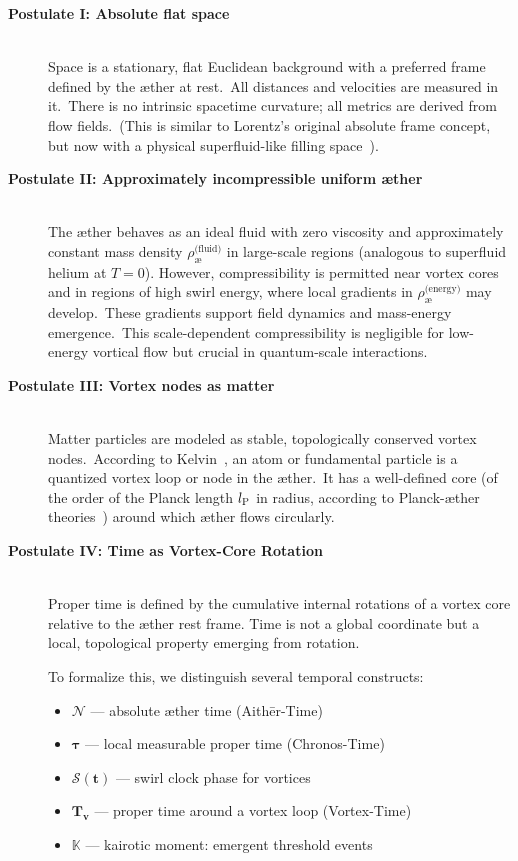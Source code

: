\documentclass[a4paper,12pt]{article}
\begin{document}
\begin{description}
    \item[\textbf{Postulate I: Absolute flat space}] \hfill \\
    Space is a stationary, flat Euclidean background with a preferred frame defined by the æther at rest.\ All distances and velocities are measured in it.\ There is no intrinsic spacetime curvature; all metrics are derived from flow fields.\ (This is similar to Lorentz's original absolute frame concept, but now with a physical superfluid-like filling space~\cite{Winterberg2002-PlanckÆther}).

    \item[\textbf{Postulate II: Approximately incompressible uniform æther}] \hfill \\
    The æther behaves as an ideal fluid with zero viscosity and approximately constant mass density \textbf{$\rho^{\text{(fluid)}}_{\text{\ae}}$} in large-scale regions (analogous to superfluid helium at $T=0$). However, compressibility is permitted near vortex cores and in regions of high swirl energy, where local gradients in \textbf{$\rho^{\text{(energy)}}_{\text{\ae}}$} may develop.\ These gradients support field dynamics and mass-energy emergence.\ This scale-dependent compressibility is negligible for low-energy vortical flow but crucial in quantum-scale interactions.

    \item[\textbf{Postulate III: Vortex nodes as matter}] \hfill \\
    Matter particles are modeled as stable, topologically conserved vortex nodes.\ According to Kelvin~\cite{Kelvin1867-vortex}, an atom or fundamental particle is a quantized vortex loop or node in the æther.\ It has a well-defined core (of the order of the Planck length $l_{\textrm P}$ in radius, according to Planck-æther theories~\cite{Winterberg2002-PlanckÆther}) around which æther flows circularly.

    \item[\textbf{Postulate IV: Time as Vortex-Core Rotation}] \hfill \\
    Proper time is defined by the cumulative internal rotations of a vortex core relative to the æther rest frame. Time is not a global coordinate but a local, topological property emerging from rotation.

    To formalize this, we distinguish several temporal constructs:

    \begin{itemize}
        \item $\boldsymbol{\mathcal{N}}$ — absolute æther time (Aithēr-Time)
        \item $\boldsymbol{\tau}$ — local measurable proper time (Chronos-Time)
        \item $\boldsymbol{\mathcal{S}(t)}$ — swirl clock phase for vortices
        \item $\boldsymbol{T_v}$ — proper time around a vortex loop (Vortex-Time)
        \item $\boldsymbol{\mathbb{K}}$ — kairotic moment: emergent threshold events
    \end{itemize}


\end{description}
\end{document}
